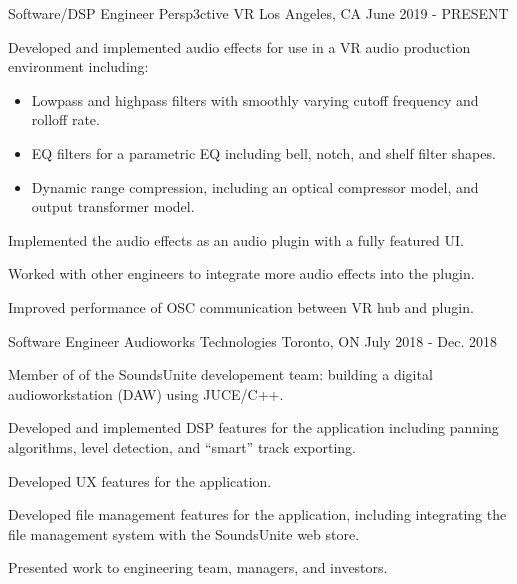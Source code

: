 

\begin{cventries}

    \cventry
    {Software/DSP Engineer} %
    {Persp3ctive VR} %
    {Los Angeles, CA} %
    {June 2019 - PRESENT} %
    {
      \begin{cvitems} %
        \item {Developed and implemented audio effects for use in a VR audio production environment including:}
        \begin{itemize}
            \item {Lowpass and highpass filters with smoothly varying cutoff frequency and rolloff rate.}
            \item {EQ filters for a parametric EQ including bell, notch, and shelf filter shapes.}
            \item {Dynamic range compression, including an optical compressor model, and output transformer model.}
        \end{itemize}
        \item {Implemented the audio effects as an audio plugin with a fully featured UI.}
        \item {Worked with other engineers to integrate more audio effects into the plugin.}
        \item {Improved performance of OSC communication between VR hub and plugin.}
      \end{cvitems}
    }

    \cventry
    {Software Engineer} %
    {Audioworks Technologies} %
    {Toronto, ON} %
    {July 2018 - Dec. 2018} %
    {
      \begin{cvitems} %
        \item {Member of of the SoundsUnite developement team: building a digital audioworkstation (DAW) using JUCE/C++.}
        \item {Developed and implemented DSP features for the application including panning algorithms, level detection, and ``smart'' track exporting.}
        \item {Developed UX features for the application.}
        \item {Developed file management features for the application, including integrating the file management system with the SoundsUnite web store.}
        \item {Presented work to engineering team, managers, and investors.}
      \end{cvitems}
    }


\end{cventries}
